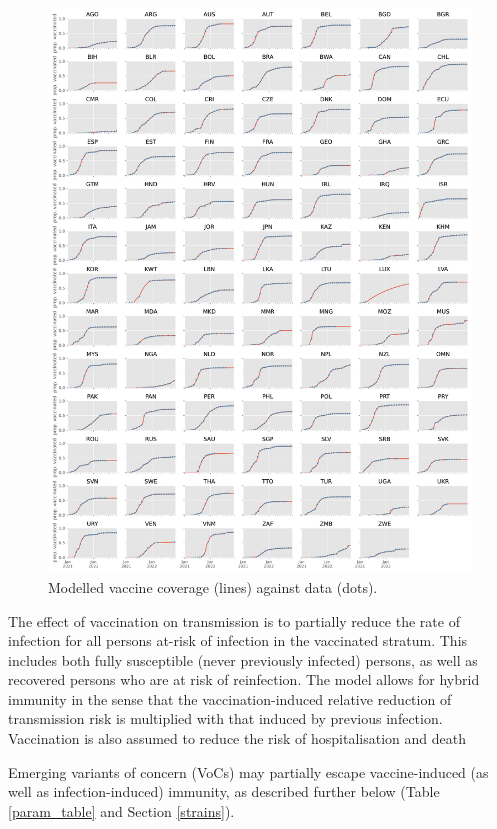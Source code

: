 \begin{figure}[h]
    \begin{center}
    \includegraphics[width=1.0\textwidth]{../../tex_descriptions/projects/sm_covid/vacc_coverage.pdf}
    \end{center}
    \caption{Modelled vaccine coverage (lines) against data (dots).
    } 
    \label{fig:vaccination}
\end{figure}

The effect of vaccination on transmission is to partially reduce the rate of infection for all persons at-risk of infection in the vaccinated stratum.
This includes both fully susceptible (never previously infected) persons,
as well as recovered persons who are at risk of reinfection. The model allows for hybrid immunity
in the sense that the vaccination-induced relative reduction of transmission risk is multiplied with that induced by previous infection. Vaccination is also assumed to reduce the risk of hospitalisation and death 

Emerging variants of concern (VoCs) may partially escape vaccine-induced (as well as infection-induced) immunity, as described further below (Table \ref{param_table} and Section \ref{strains}).

